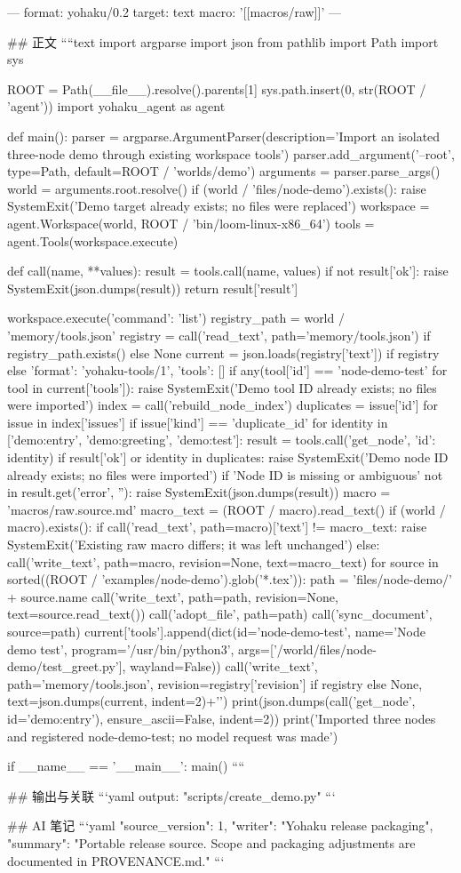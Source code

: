 ---
format: yohaku/0.2
target: text
macro: '[[macros/raw]]'
---

## 正文
````text
import argparse
import json
from pathlib import Path
import sys


ROOT = Path(__file__).resolve().parents[1]
sys.path.insert(0, str(ROOT / 'agent'))
import yohaku_agent as agent


def main():
    parser = argparse.ArgumentParser(description='Import an isolated three-node demo through existing workspace tools')
    parser.add_argument('--root', type=Path, default=ROOT / 'worlds/demo')
    arguments = parser.parse_args()
    world = arguments.root.resolve()
    if (world / 'files/node-demo').exists():
        raise SystemExit('Demo target already exists; no files were replaced')
    workspace = agent.Workspace(world, ROOT / 'bin/loom-linux-x86_64')
    tools = agent.Tools(workspace.execute)

    def call(name, **values):
        result = tools.call(name, values)
        if not result['ok']:
            raise SystemExit(json.dumps(result))
        return result['result']

    workspace.execute({'command': 'list'})
    registry_path = world / 'memory/tools.json'
    registry = call('read_text', path='memory/tools.json') if registry_path.exists() else None
    current = json.loads(registry['text']) if registry else {'format': 'yohaku-tools/1', 'tools': []}
    if any(tool['id'] == 'node-demo-test' for tool in current['tools']):
        raise SystemExit('Demo tool ID already exists; no files were imported')
    index = call('rebuild_node_index')
    duplicates = {issue['id'] for issue in index['issues'] if issue['kind'] == 'duplicate_id'}
    for identity in ['demo:entry', 'demo:greeting', 'demo:test']:
        result = tools.call('get_node', {'id': identity})
        if result['ok'] or identity in duplicates:
            raise SystemExit('Demo node ID already exists; no files were imported')
        if 'Node ID is missing or ambiguous' not in result.get('error', ''):
            raise SystemExit(json.dumps(result))
    macro = 'macros/raw.source.md'
    macro_text = (ROOT / macro).read_text()
    if (world / macro).exists():
        if call('read_text', path=macro)['text'] != macro_text:
            raise SystemExit('Existing raw macro differs; it was left unchanged')
    else:
        call('write_text', path=macro, revision=None, text=macro_text)
    for source in sorted((ROOT / 'examples/node-demo').glob('*.tex')):
        path = 'files/node-demo/' + source.name
        call('write_text', path=path, revision=None, text=source.read_text())
        call('adopt_file', path=path)
        call('sync_document', source=path)
    current['tools'].append(dict(id='node-demo-test', name='Node demo test', program='/usr/bin/python3',
                                 args=['/world/files/node-demo/test_greet.py'], wayland=False))
    call('write_text', path='memory/tools.json', revision=registry['revision'] if registry else None,
         text=json.dumps(current, indent=2)+'\n')
    print(json.dumps(call('get_node', id='demo:entry'), ensure_ascii=False, indent=2))
    print('Imported three nodes and registered node-demo-test; no model request was made')


if __name__ == '__main__':
    main()
````

## 输出与关联
```yaml
output: "scripts/create_demo.py"
```

## AI 笔记
```yaml
{"source_version": 1, "writer": "Yohaku release packaging", "summary": "Portable release source. Scope and packaging adjustments are documented in PROVENANCE.md."}
```
